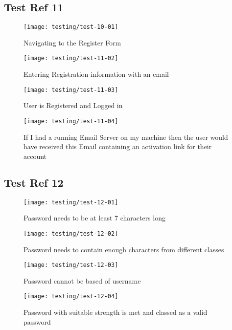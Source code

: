 \subsection{Test Ref 11}

\begin{figure}[H]
\centering
\texttt{[image: testing/test-10-01]}
\caption{Navigating to the Register Form}
\label{test-11-01}
\end{figure}

\begin{figure}[H]
\centering
\texttt{[image: testing/test-11-02]}
\caption{Entering Registration information with an email}
\label{test-11-02}
\end{figure}

\begin{figure}[H]
\centering
\texttt{[image: testing/test-11-03]}
\caption{User is Registered and Logged in}
\label{test-11-03}
\end{figure}

\begin{figure}[H]
\centering
\texttt{[image: testing/test-11-04]}
\caption{If I had a running Email Server on my machine then the user would have received this Email containing an activation link for their account}
\label{test-11-03}
\end{figure}

\subsection{Test Ref 12}

\begin{figure}[H]
\centering
\texttt{[image: testing/test-12-01]}
\caption{Password needs to be at least 7 characters long}
\label{test-12-01}
\end{figure}

\begin{figure}[H]
\centering
\texttt{[image: testing/test-12-02]}
\caption{Password needs to contain enough characters from different classes}
\label{test-12-02}
\end{figure}

\begin{figure}[H]
\centering
\texttt{[image: testing/test-12-03]}
\caption{Password cannot be based of username}
\label{test-12-03}
\end{figure}

\begin{figure}[H]
\centering
\texttt{[image: testing/test-12-04]}
\caption{Password with suitable strength is met and classed as a valid password}
\label{test-12-04}
\end{figure}

